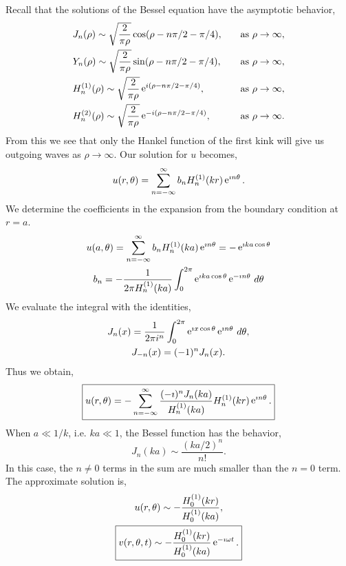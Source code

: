 {\begin{Solution}
  Recall that the solutions of the Bessel equation have the asymptotic 
  behavior,
  \begin{alignat*}{2}
    &J_n(\rho) \sim \sqrt{ \frac{2}{\pi\rho} } \cos(\rho - n \pi/2 - \pi/4), \quad
    &\mathrm{as}\ \rho \to \infty, \\
    &Y_n(\rho) \sim \sqrt{ \frac{2}{\pi\rho} } \sin(\rho - n \pi/2 - \pi/4), \quad
    &\mathrm{as}\ \rho \to \infty, \\
    &H_n^{(1)}(\rho) \sim \sqrt{ \frac{2}{\pi\rho} } \mathop{\mathrm{e}}\nolimits^{i(\rho - n \pi/2 - \pi/4)}
    ,\quad &\mathrm{as}\ \rho \to \infty, \\
    &H_n^{(2)}(\rho) \sim \sqrt{ \frac{2}{\pi\rho} } \mathop{\mathrm{e}}\nolimits^{-i(\rho- n \pi/2 - \pi/4)}
    ,\quad &\mathrm{as}\ \rho \to \infty.
  \end{alignat*}
  From this we see that only the Hankel function of the first kink will give us
  outgoing waves as $\rho \to \infty$.  Our solution for $u$ becomes,
  \[
  u(r, \theta) = \sum_{n = -\infty}^\infty b_n H_n^{(1)}(k r) \mathop{\mathrm{e}}\nolimits^{\imath n \theta}.
  \]
  We determine the coefficients in the expansion from the boundary condition
  at $r = a$.
  \begin{gather*}
    u(a, \theta) = \sum_{n = -\infty}^\infty b_n H_n^{(1)}(k a) \mathop{\mathrm{e}}\nolimits^{\imath n \theta} 
    = - \mathop{\mathrm{e}}\nolimits^{\imath k a \cos \theta} \\
    b_n = - \frac{1}{2 \pi H_n^{(1)}(k a)} \int_0^{2 \pi} \mathop{\mathrm{e}}\nolimits^{\imath k a \cos \theta}
    \mathop{\mathrm{e}}\nolimits^{-\imath n \theta} \,d \theta
  \end{gather*}
  We evaluate the integral with the identities,
  \begin{gather*}
    J_n(x) = \frac{1}{2 \pi i^n} \int_0^{2 \pi} \mathop{\mathrm{e}}\nolimits^{\imath x \cos \theta} 
    \mathop{\mathrm{e}}\nolimits^{\imath n \theta} \,d \theta, \\
    J_{-n}(x) = (-1)^n J_n(x).
  \end{gather*}
  Thus we obtain,
  \[
  \boxed{
    u(r, \theta) = - \sum_{n = -\infty}^\infty \frac{ (-\imath)^n J_n(k a)}{H_n^{(1)}(k a)}
    H_n^{(1)}(k r) \mathop{\mathrm{e}}\nolimits^{\imath n \theta}.
    }
  \]
  When $a \ll 1/k$, i.e. $k a \ll 1$, the Bessel function has the behavior,
  \[
  J_n(k a) \sim \frac{(k a/2)^n}{n!}.
  \]
  In this case, the $n \neq 0$ terms in the sum are much smaller than the
  $n = 0$ term.  The approximate solution is,
  \begin{gather*}
    u(r, \theta) \sim - \frac{ H_0^{(1)}(k r) }{ H_0^{(1)}(k a) }, \\
    \boxed{
      v(r, \theta, t) \sim - \frac{ H_0^{(1)}(k r) }{ H_0^{(1)}(k a) } 
      \mathop{\mathrm{e}}\nolimits^{-\imath \omega t}.
      }
  \end{gather*}
\end{Solution}














}
